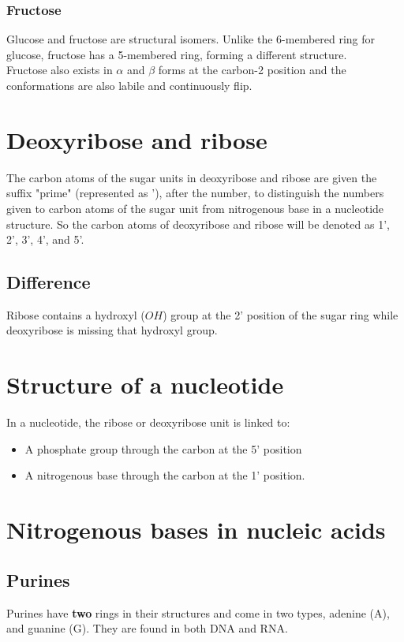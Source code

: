 \documentclass[11pt]{article}
\begin{document}
\newpage

\subsubsection{Fructose}
\label{sec:org78f53c0}
Glucose and fructose are structural isomers. Unlike the 6-membered ring for glucose, fructose has a 5-membered ring, forming a different structure.
\\[0pt]

Fructose also exists in \(\alpha\) and \(\beta\) forms at the carbon-2 position and the conformations are also labile and continuously flip.


\section{Deoxyribose and ribose}
\label{sec:orgd6e1280}
The carbon atoms of the sugar units in deoxyribose and ribose are given the suffix "prime" (represented as '), after the number, to distinguish the numbers given to carbon atoms of the sugar unit from nitrogenous base in a nucleotide structure. So the carbon atoms of deoxyribose and ribose will be denoted as 1', 2', 3', 4', and 5'.

\subsection{Difference}
\label{sec:org6f68407}
Ribose contains a hydroxyl (\(OH\)) group at the 2' position of the sugar ring while deoxyribose is missing that hydroxyl group.

\section{Structure of a nucleotide}
\label{sec:org0c2d652}
In a nucleotide, the ribose or deoxyribose unit is linked to:
\begin{itemize}
\item A phosphate group through the carbon at the 5' position
\item A nitrogenous base through the carbon at the 1' position.
\end{itemize}

\section{Nitrogenous bases in nucleic acids}
\label{sec:org53661c1}

\subsection{Purines}
\label{sec:orgdc941d8}
Purines have \textbf{two} rings in their structures and come in two types, adenine (A), and guanine (G). They are found in both DNA and RNA.
\end{document}
